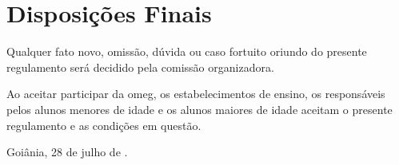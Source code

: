 \section*{Disposições Finais}

\begin{article}
  Qualquer fato novo, omissão, dúvida ou caso fortuito oriundo do presente
  regulamento será decidido pela comissão organizadora.
\end{article}

\begin{article}
  Ao aceitar participar da \currentEdition{} \acrshort{omeg}, os
  estabelecimentos de ensino, os responsáveis pelos alunos menores de idade e
  os alunos maiores de idade aceitam o presente regulamento e as condições em
  questão.
\end{article}

Goiânia, 28 de julho de \year.
